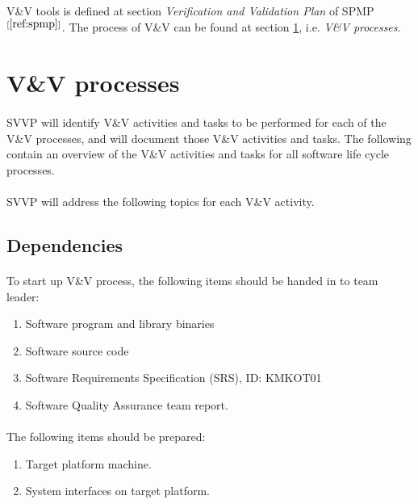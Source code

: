 \documentclass[11pt,a4paper]{article}
\begin{document}
            \paragraph{} V\&V tools is defined at section \emph{Verification and Validation Plan} of SPMP$^{[\ref{ref:spmp}]}$. The process of V\&V can be found at section \ref{section:process}, i.e. \emph{V\&V processes}.
    \clearpage
    \section{V\&V processes}\label{section:process}
        \paragraph{} SVVP will identify V\&V activities and tasks to be performed for each of the V\&V processes, and will document those V\&V activities and tasks. The following contain an overview of the V\&V activities and tasks for all software life cycle processes.
        \paragraph{} SVVP will address the following topics for each V\&V activity.
        \subsection{Dependencies}
            \paragraph{} To start up V\&V process, the following items should be handed in to team leader:
            \begin{enumerate}
                \item Software program and library binaries
                \item Software source code
                \item Software Requirements Specification (SRS), ID: KMKOT01
                \item Software Quality Assurance team report.
            \end{enumerate}
            \paragraph{} The following items should be prepared:
            \begin{enumerate}
                \item Target platform machine.
                \item System interfaces on target platform.
            \end{enumerate}
\end{document}
